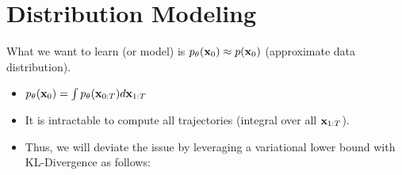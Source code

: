 \section{Distribution Modeling}
What we want to learn (or model) is $p_\theta({\mathbf{x}}_0)\approx p({\mathbf{x}}_0)$ (approximate data distribution).
\begin{itemize}
	\item $p_\theta({\mathbf{x}}_0) = \int p_\theta({\mathbf{x}}_{0:T})d{\mathbf{x}}_{1:T}$
	\item It is intractable to compute all trajectories (\ie integral over all ${\mathbf{x}}_{1:T}$). 
	\item Thus, we will deviate the issue by leveraging a variational lower bound with KL-Divergence as follows:
\end{itemize}

